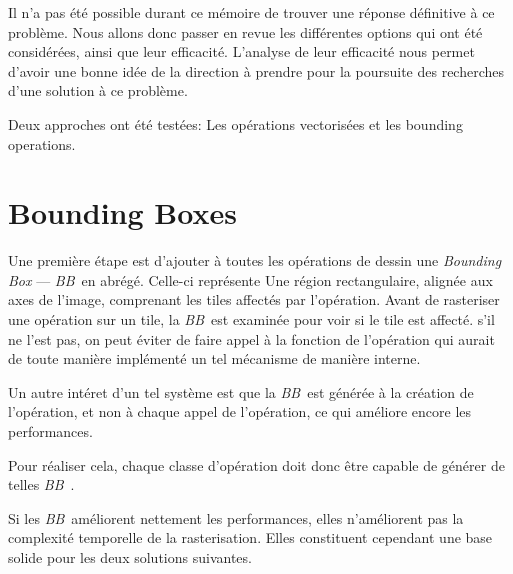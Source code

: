 		Il n'a pas été possible durant ce mémoire de trouver une réponse définitive à ce problème. Nous allons donc 
		passer en revue les différentes options qui ont été considérées, ainsi que leur efficacité. L'analyse de leur
		efficacité nous permet d'avoir une bonne idée de la direction à prendre pour la poursuite des recherches d'une
		solution à ce problème.

		Deux approches ont été testées: Les opérations vectorisées et les bounding operations. 	


	\section{Bounding Boxes}
\newcommand{\BB}{\emph{BB}~}
		Une première étape est d'ajouter à toutes les opérations de dessin une \emph{Bounding Box} --- \BB en abrégé.
		Celle-ci représente
		Une région rectangulaire, alignée aux axes de l'image, comprenant les tiles affectés par l'opération. Avant de rasteriser une opération 
		sur un tile, la \BB est examinée pour voir si le tile est affecté. s'il ne l'est pas, on peut éviter 
		de faire appel à la fonction de l'opération qui aurait de toute manière implémenté un tel mécanisme 
		de manière interne.

		Un autre intéret d'un tel système est que la \BB est générée à la création de l'opération, et non à
		chaque appel de l'opération, ce qui améliore encore les performances.
		
		Pour réaliser cela, chaque classe d'opération doit donc être capable de générer de telles \BB.

		Si les \BB améliorent nettement les performances, elles n'améliorent pas la complexité
		temporelle de la rasterisation. Elles constituent cependant une base solide pour les deux solutions suivantes. 

